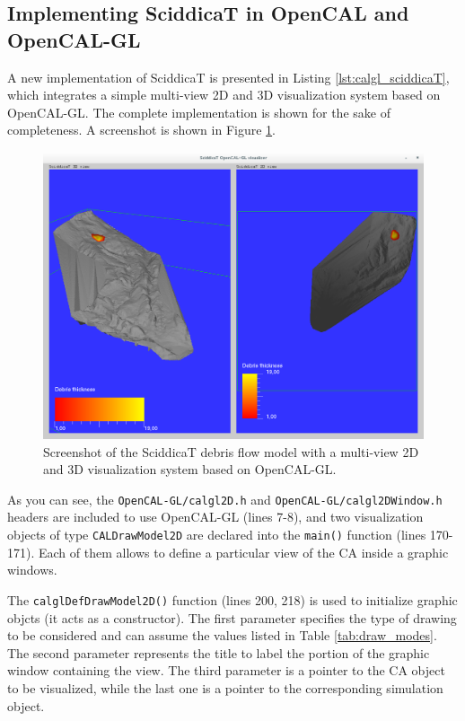 \subsection{Implementing SciddicaT in OpenCAL and OpenCAL-GL}

A new implementation of SciddicaT is presented in Listing
\ref{lst:calgl_sciddicaT}, which integrates a simple multi-view 2D and
3D visualization system based on OpenCAL-GL. The complete
implementation is shown for the sake of completeness. A screenshot is
shown in Figure \ref{fig:calgl_sciddicaT1}.

\begin{figure}
  \begin{center}
    \includegraphics[width=12cm]{./images/OpenCAL/calgl_sciddicaT1}
    \caption{Screenshot of the SciddicaT debris flow model with a
      multi-view 2D and 3D visualization system based on OpenCAL-GL.}
    \label{fig:calgl_sciddicaT1}
  \end{center}
\end{figure}



As you can see, the \verb'OpenCAL-GL/calgl2D.h' and
\verb'OpenCAL-GL/calgl2DWindow.h' headers are included to use
OpenCAL-GL (lines 7-8), and two visualization objects of type
\verb'CALDrawModel2D' are declared into the \verb'main()' function
(lines 170-171). Each of them allows to define a particular view of
the CA inside a graphic windows.

The \verb'calglDefDrawModel2D()' function (lines 200, 218) is used to
initialize graphic objcts (it acts as a constructor). The first
parameter specifies the type of drawing to be considered and can
assume the values listed in Table \ref{tab:draw_modes}. The second
parameter represents the title to label the portion of the graphic
window containing the view. The third parameter is a pointer to the CA
object to be visualized, while the last one is a pointer to the
corresponding simulation object.

